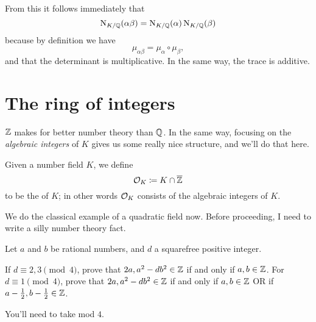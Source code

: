From this it follows immediately that
\[ \operatorname{N}_{K/\mathbb Q}(\alpha\beta) = \operatorname{N}_{K/\mathbb Q}(\alpha)\operatorname{N}_{K/\mathbb Q}(\beta) \]
because by definition we have
\[ \mu_{\alpha\beta} = \mu_\alpha \circ \mu_\beta, \]
and that the determinant is multiplicative.
In the same way, the trace is additive.

\section{The ring of integers}

$\mathbb Z$ makes for better number theory than $\mathbb Q$.
In the same way, focusing on the \emph{algebraic integers} of $K$
gives us some really nice structure, and we'll do that here.

\begin{definition}
	Given a number field $K$, we define
	\[ \mathcal O_K \coloneqq K \cap \overline{\mathbb Z} \]
	to be the  of $K$;
	in other words $\mathcal O_K$ consists of the algebraic integers of $K$.
\end{definition}

We do the classical example of a quadratic field now.
Before proceeding, I need to write a silly number theory fact.
\begin{exercise}
	Let $a$ and $b$ be rational numbers, and $d$ a squarefree positive integer.
	\begin{itemize}
		\ii If $d \equiv 2, 3 \pmod 4$, prove that
		$2a, a^2-db^2 \in \mathbb Z$ if and only if $a,b \in \mathbb Z$.
		\ii For $d \equiv 1 \pmod 4$, prove that
		$2a, a^2-db^2 \in \mathbb Z$ if and only if $a,b \in \mathbb Z$
		OR if $a -\frac{1}{2}, b-\frac{1}{2} \in \mathbb Z$.
	\end{itemize}
	You'll need to take mod $4$.
\end{exercise}

